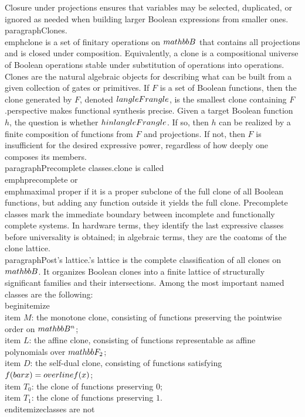 Closure under projections ensures that variables may be selected, duplicated, or ignored as needed when building larger Boolean expressions from smaller ones.\n\n\\paragraph{Clones.}\nA \\emph{clone} is a set of finitary operations on $\\mathbb{B}$ that contains all projections and is closed under composition. Equivalently, a clone is a compositional universe of Boolean operations stable under substitution of operations into operations. Clones are the natural algebraic objects for describing what can be built from a given collection of gates or primitives. If $F$ is a set of Boolean functions, then the clone generated by $F$, denoted $\\langle F\\rangle$, is the smallest clone containing $F$.\n\nThis perspective makes functional synthesis precise. Given a target Boolean function $h$, the question is whether $h \\in \\langle F\\rangle$. If so, then $h$ can be realized by a finite composition of functions from $F$ and projections. If not, then $F$ is insufficient for the desired expressive power, regardless of how deeply one composes its members.\n\n\\paragraph{Precomplete classes.}\nA clone is called \\emph{precomplete} or \\emph{maximal proper} if it is a proper subclone of the full clone of all Boolean functions, but adding any function outside it yields the full clone. Precomplete classes mark the immediate boundary between incomplete and functionally complete systems. In hardware terms, they identify the last expressive classes before universality is obtained; in algebraic terms, they are the coatoms of the clone lattice.\n\n\\paragraph{Post's lattice.}\nPost's lattice is the complete classification of all clones on $\\mathbb{B}$. It organizes Boolean clones into a finite lattice of structurally significant families and their intersections. Among the most important named classes are the following:\n\\begin{itemize}\n  \\item $M$: the monotone clone, consisting of functions preserving the pointwise order on $\\mathbb{B}^n$;\n  \\item $L$: the affine clone, consisting of functions representable as affine polynomials over $\\mathbb{F}_2$;\n  \\item $D$: the self-dual clone, consisting of functions satisfying $f(\\bar{x}) = \\overline{f(x)}$;\n  \\item $T_0$: the clone of functions preserving $0$;\n  \\item $T_1$: the clone of functions preserving $1$.\n\\end{itemize}\nThese classes are not 